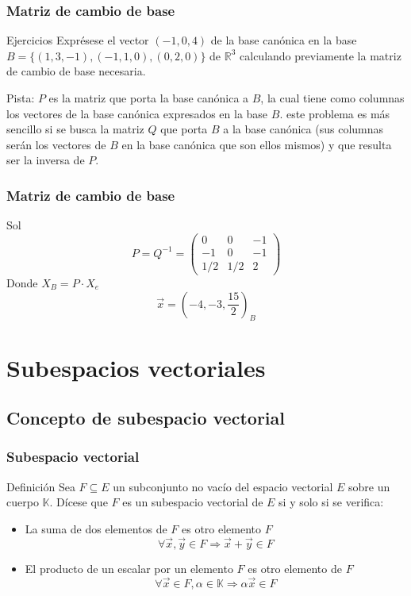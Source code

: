 \documentclass{beamer}
\begin{document}
 \begin{frame}
  \frametitle{Matriz de cambio de base}
\begin{block}{Ejercicios}
Expr\'esese el vector $(-1,0,4)$ de la base can\'onica en la base $B=\{(1,3,-1),(-1,1,0),(0,2,0)\}$ de $\mathbb R^3$ calculando previamente la matriz de cambio de base necesaria.
 \end{block}
 Pista: $P$ es la matriz que porta la base can\'onica a $B$, la cual tiene como columnas los vectores de la base can\'onica expresados en la base $B$. este problema es m\'as sencillo si se busca la matriz $Q$ que porta $B$ a la base can\'onica (sus columnas ser\'an los vectores de $B$ en la base can\'onica que son ellos mismos) y que resulta ser la inversa de $P$.
\end{frame}

\begin{frame}
  \frametitle{Matriz de cambio de base}
Sol
\[P = Q^{-1} = \left(\begin{array}{ccc}
0&0&-1\\
-1&0&-1\\
1/2&1/2&2
\end{array}\right)\]
Donde $X_B = P\cdot X_{e}$
\[\vec x = \left(-4,-3,\frac{15}{2}\right)_{B}\]
\end{frame}


\section{Subespacios vectoriales}
\subsection{Concepto de subespacio vectorial}

 \begin{frame}
  \frametitle{Subespacio vectorial}
\begin{block}{Definici\'on}
Sea $F\subseteq E$ un subconjunto no vac\'io del espacio vectorial $E$ sobre un cuerpo $\mathbb K$. D\'icese que $F$ es un subespacio vectorial de $E$ si y solo si se verifica:
\begin{itemize}
\item La suma de dos elementos de $F$ es otro elemento $F$
\[\forall \vec x, \vec y\in F \Rightarrow \vec x +\vec y\in F\]
\item El producto de un escalar por un elemento $F$ es otro elemento de $F$
\[\forall \vec x \in F, \alpha\in \mathbb K \Rightarrow \alpha \vec x\in F\]
\end{itemize}
 \end{block}

\end{frame}
\end{document}
